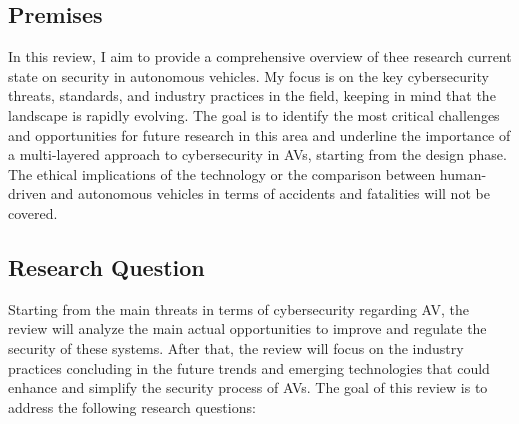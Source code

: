 \subsection{Premises}\label{subsec:premises}

In this review,
I aim to provide a comprehensive overview of thee research current state on security in autonomous vehicles.
My focus is on the key cybersecurity threats, standards, and industry practices in the field,
keeping in mind that the landscape is rapidly evolving.
The goal is to identify the most critical challenges and opportunities for future research in this area
and underline the importance of a multi-layered approach to cybersecurity in AVs, starting from the design phase.
The ethical implications of the technology or the comparison between human-driven and autonomous vehicles in terms of accidents and fatalities will not be covered.

\subsection{Research Question}\label{subsec:research-question}

Starting from the main threats in terms of cybersecurity regarding AV, the review will analyze the main actual opportunities to improve and regulate the security of these systems.
After that, the review will focus on the industry practices concluding in the future trends and emerging technologies that could enhance and simplify the security process of AVs.
The goal of this review is to address the following research questions:

